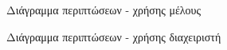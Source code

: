 \documentclass{assignment}
\begin{document}
\begin{figure}
\begin{center}
\caption{Διάγραμμα περιπτώσεων - χρήσης μέλους}
\label{fig:use_case_member}
\end{center}
\end{figure}

\begin{figure}
\begin{center}
\caption{Διάγραμμα περιπτώσεων - χρήσης διαχειριστή}
\label{fig:use_case_administrator}
\end{center}
\end{figure}
\end{document}
